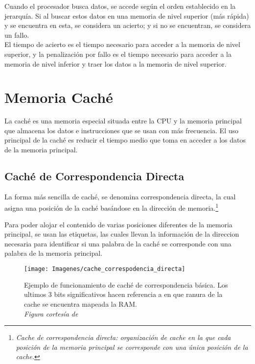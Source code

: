 \documentclass[12pt]{article}
\begin{document}
	Cuando el procesador busca datos, se accede según el orden establecido en la jerarquía. Si al buscar estos datos en una memoria de nivel superior (más rápida) y se encuentra en esta, se considera un acierto; y si no se encuentran, se considera un fallo.\\

	El tiempo de acierto es el tiempo necesario para acceder a la memoria de nivel superior, y la penalización por fallo es el tiempo necesario para acceder a la memoria de nivel inferior y traer los datos a la memoria de nivel superior.

	\section{Memoria Caché} \cite{patterson-2011}
	La caché es una memoria especial situada entre la CPU y la memoria principal que almacena los datos e instrucciones que se usan con más frecuencia. El uso principal de la caché es reducir el tiempo medio que toma en acceder a los datos de la memoria principal. \cite{geeksforgeeks-2023} \\

	\subsection{Caché de Correspondencia Directa}
	La forma más sencilla de caché, se denomina correspondencia directa, la cual asigna una posición de la caché basándose en la dirección de memoria.\footnote{\textit{Cache de correspondencia directa: organización de cache en la que cada posición de la memoria principal se corresponde con una única posición de la cache.}}

	Para poder alojar el contenido de varias posiciones diferentes de la memoria principal, se usan las etiquetas, las cuales llevan la información de la direccion necesaria para identificar si una palabra de la caché se corresponde con una palabra de la memoria principal.

	\begin{figure}[H]
		\centering
		\texttt{[image: Imagenes/cache\_correspodencia\_directa]}
		\caption{Ejemplo de funcionamiento de caché de correspondencia básica. Los ultimos 3 bits significativos hacen referencia a en que ranura de la cache se encuentra mapeada la RAM.\\
			\textit{Figura cortesía de \cite{patterson-2011}}}
		\label{fig:cachecorrespodenciadirecta}
	\end{figure}
\end{document}

